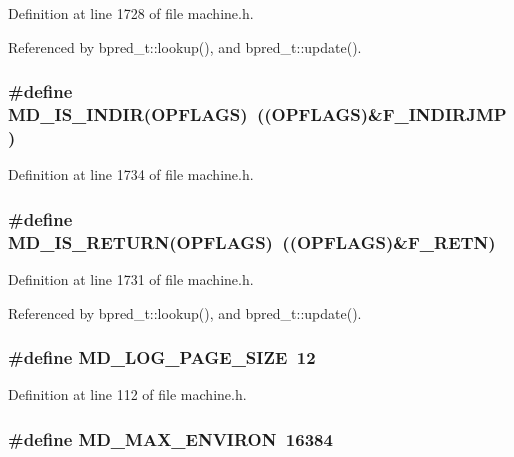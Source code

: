 Definition at line 1728 of file machine.h.

Referenced by bpred\_\-t::lookup(), and bpred\_\-t::update().
\subsubsection[{MD\_\-IS\_\-INDIR}]{\setlength{\rightskip}{0pt plus 5cm}\#define MD\_\-IS\_\-INDIR(OPFLAGS)~((OPFLAGS)\&F\_\-INDIRJMP)}\label{machine_8h_9729eca40d73fc314c6e7ed787fe0e4c}




Definition at line 1734 of file machine.h.
\subsubsection[{MD\_\-IS\_\-RETURN}]{\setlength{\rightskip}{0pt plus 5cm}\#define MD\_\-IS\_\-RETURN(OPFLAGS)~((OPFLAGS)\&F\_\-RETN)}\label{machine_8h_932b9c157a6c858890733a539ca8eb20}




Definition at line 1731 of file machine.h.

Referenced by bpred\_\-t::lookup(), and bpred\_\-t::update().
\subsubsection[{MD\_\-LOG\_\-PAGE\_\-SIZE}]{\setlength{\rightskip}{0pt plus 5cm}\#define MD\_\-LOG\_\-PAGE\_\-SIZE~12}\label{machine_8h_f2963d87ddca0492a595fe0b6ff8d9e4}




Definition at line 112 of file machine.h.
\subsubsection[{MD\_\-MAX\_\-ENVIRON}]{\setlength{\rightskip}{0pt plus 5cm}\#define MD\_\-MAX\_\-ENVIRON~16384}\label{machine_8h_bc3697b72722c398009c778f30919504}




